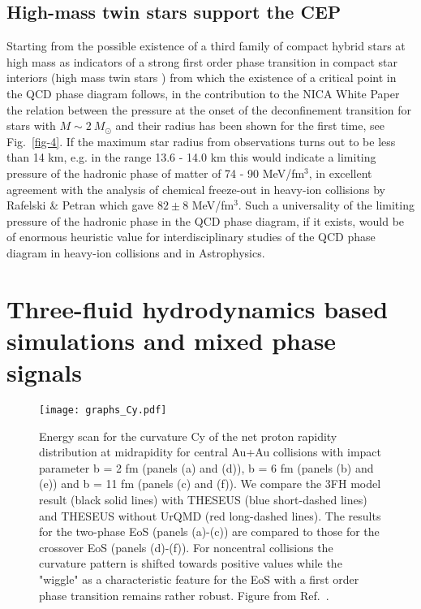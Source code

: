 \documentclass{webofc}
\begin{document}
\subsection{High-mass twin stars support the CEP}

Starting from the possible existence of a third family of compact hybrid stars at high mass as indicators 
of a strong first order phase transition in compact star interiors \cite{Blaschke:2013ana} (high mass twin stars \cite{Benic:2014jia}) from which the existence of a critical point in the QCD phase diagram follows,
in the contribution \cite{9} to the NICA White Paper the relation between the pressure at the onset of the deconfinement transition for stars with $M\sim 2~M_\odot$ and their radius has been shown for the first time, see Fig.~\ref{fig-4}.      
If the maximum star radius from observations turns out to be less than 14 km, e.g. in the range 
13.6 - 14.0 km  this would indicate a limiting pressure of the hadronic phase of matter of 
74 - 90 MeV/fm$^3$, in excellent agreement with the analysis of chemical freeze-out in heavy-ion collisions 
by Rafelski \& Petran \cite{Petran:2013qla} which gave $82\pm 8$ MeV/fm$^3$. 
Such a universality of the limiting pressure of the hadronic phase in the QCD phase diagram, if it exists,  would be of enormous heuristic value for interdisciplinary studies of the QCD phase diagram in heavy-ion collisions and in Astrophysics. 
 
\section{Three-fluid hydrodynamics based simulations and mixed phase signals
\label{sec:3FH}}

\begin{figure}[!ht]
\centering
\texttt{[image: graphs\_Cy.pdf]}
\caption{Energy scan for the curvature Cy of the net proton rapidity distribution at midrapidity for central
Au+Au collisions with impact parameter b = 2 fm (panels (a) and (d)), b = 6 fm (panels (b) and (e)) and b = 11 fm (panels (c) and (f)). 
We compare the 3FH model result (black solid lines) with THESEUS (blue short-dashed lines) and THESEUS without UrQMD (red long-dashed lines). The results for the two-phase EoS (panels (a)-(c)) are compared to those for the crossover EoS (panels (d)-(f)). 
For noncentral collisions the curvature pattern is shifted towards positive values while the
"wiggle" as a characteristic feature for the EoS with a first order phase transition remains rather robust.
Figure from Ref.~\cite{2}.}
\label{fig-5}       %
\end{figure}
 
\end{document}
